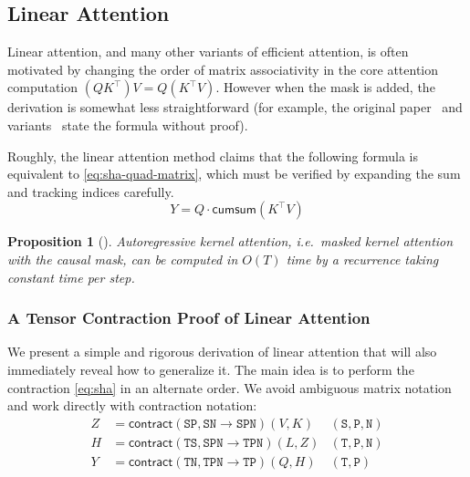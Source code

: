 \documentclass{article}
\newcommand{\citep}{\parencite}
\newtheorem{proposition}[theorem]{Proposition}
\begin{document}
\subsection{Linear Attention}
\label{sec:linear-attention}

Linear attention, and many other variants of efficient attention, is often motivated by changing the order of matrix associativity in the core attention computation $(QK^\top)V = Q(K^\top V)$.
However when the mask is added, the derivation is somewhat less straightforward (for example, the original paper~\citep{katharopoulos2020transformers} and variants~\citep{sun2023retentive} state the formula without proof).

Roughly, the linear attention method claims that the following formula
is equivalent to \eqref{eq:sha-quad-matrix}, which must be verified by expanding the sum and tracking indices carefully.
\begin{equation}
  \label{eq:sha-lin-matrix}
  Y = Q \cdot \mathsf{cumsum}(K^\top V)
\end{equation}

\begin{proposition}[\citep{katharopoulos2020transformers}]
  \label{prop:linear-attention}
  Autoregressive kernel attention, i.e.\ masked kernel attention with the causal mask, can be computed in $O(T)$ time by a recurrence taking constant time per step.
\end{proposition}

\subsubsection{A Tensor Contraction Proof of Linear Attention}

We present a simple and rigorous derivation of linear attention that will also immediately reveal how to generalize it.
The main idea is to perform the contraction \eqref{eq:sha} in an alternate order.
We avoid ambiguous matrix notation and work directly with contraction notation:
\begin{subequations}
  \label{eq:sha-lin}
  \begin{align}
    \label{eq:sha-lin:1}
    Z &= \mathsf{contract}(\mathtt{SP},\mathtt{SN} \to \mathtt{SPN})(V, K) & \mathtt{(S,P,N)} \\
    \label{eq:sha-lin:2}
    H &= \mathsf{contract}(\mathtt{TS},\mathtt{SPN} \to \mathtt{TPN})(L, Z) & \mathtt{(T,P,N)} \\
    \label{eq:sha-lin:3}
    Y &= \mathsf{contract}(\mathtt{TN},\mathtt{TPN} \to \mathtt{TP})(Q, H) & \mathtt{(T,P)}
  \end{align}
\end{subequations}
\end{document}
